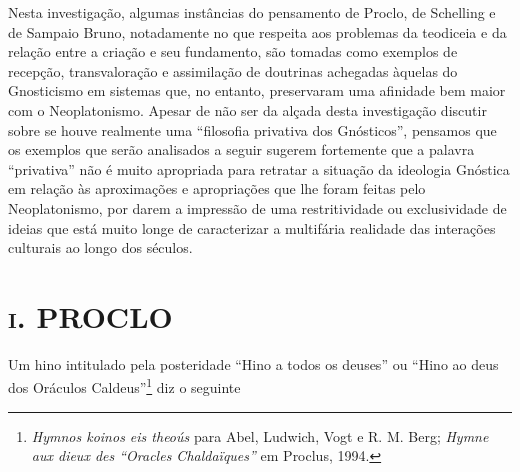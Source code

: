 Nesta investigação, algumas instâncias do pensamento de Proclo,
de Schelling e de Sampaio Bruno, notadamente no que respeita aos
problemas da teodiceia e da relação entre a criação e seu
fundamento, são tomadas como exemplos de recepção,
transvaloração e assimilação de doutrinas achegadas àquelas do
Gnosticismo em sistemas que, no entanto, preservaram uma
afinidade bem maior com o Neoplatonismo. Apesar de não ser da
alçada desta investigação discutir sobre se houve realmente uma
“filosofia privativa dos Gnósticos”, pensamos que os exemplos
que serão analisados a seguir sugerem fortemente que a palavra
“privativa” não é muito apropriada para retratar a situação da
ideologia Gnóstica em relação às aproximações e apropriações que
lhe foram feitas pelo Neoplatonismo, por darem a impressão de
uma restritividade ou exclusividade de ideias que está muito
longe de caracterizar a multifária realidade das interações
culturais ao longo dos séculos.

\section{\textsc{i}. PROCLO}

Um hino intitulado pela posteridade “Hino a todos os deuses” ou
“Hino ao deus dos Oráculos Caldeus”\footnote{ \emph{Hymnos
koinos eis theoús} para Abel, Ludwich, Vogt e R. M. Berg;
\emph{Hymne aux dieux des ``Oracles Chaldaïques''} em Proclus,
1994.} diz o seguinte

